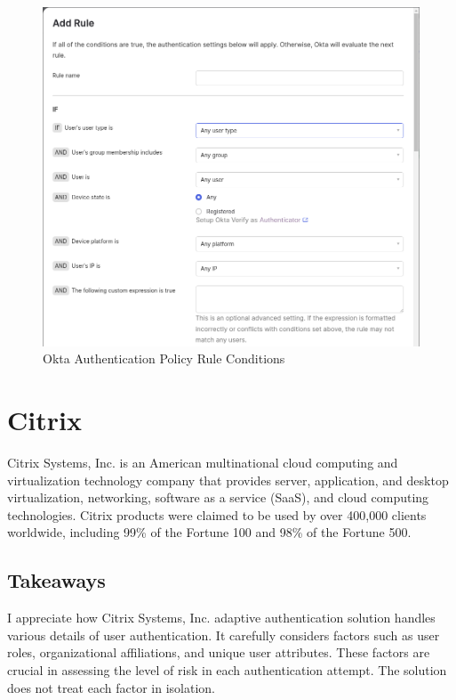\begin{figure}[htbp]
  \centering
  \includegraphics[width=1\textwidth]{img/okta-add-rule.png}
  \caption{Okta Authentication Policy Rule Conditions}
  \label{fig:okta-auth-policy-rule-condition}
\end{figure}

\newpage
\section{Citrix}

Citrix Systems, Inc. is an American multinational cloud computing and virtualization technology company that provides server, application, and desktop virtualization, networking, software as a service (SaaS), and cloud computing technologies.
Citrix products were claimed to be used by over 400,000 clients worldwide, including 99\% of the Fortune 100 and 98\% of the Fortune 500.

\subsection*{Takeaways}
I appreciate how Citrix Systems, Inc. adaptive authentication solution handles various details of user authentication.
It carefully considers factors such as user roles, organizational affiliations, and unique user attributes.
These factors are crucial in assessing the level of risk in each authentication attempt.
The solution does not treat each factor in isolation.\cite{existing-citrix-wiki} \cite{existing-citrix-blog}

